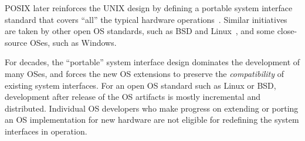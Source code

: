 POSIX later
reinforces the UNIX design by defining a portable system interface standard that covers ``all'' the typical hardware operations~\cite{ieee-posix}.
Similar initiatives are taken by other open OS standards, such as BSD and Linux~\cite{quarterman85bsd,linux-standard-base},
and some close-source OSes,  such as Windows.



For decades, the ``portable'' system interface design dominates the development of many OSes, and forces the new OS extensions
to preserve the {\em compatibility} of existing system interfaces.
For an open OS standard such as Linux or BSD,
development after release of the OS artifacts is  mostly incremental and distributed.
Individual OS developers who make progress
on extending or porting an OS implementation
for new hardware
are not eligible for redefining the system interfaces in operation.


